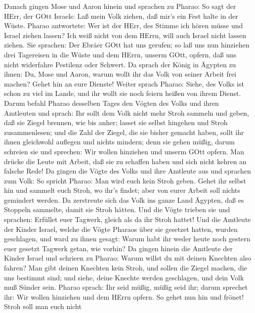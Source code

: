  Danach gingen Mose und Aaron hinein und sprachen zu Pharao:
So sagt der HErr, der GOtt Israels: Laß mein Volk ziehen, daß mir's ein
Fest halte in der Wüste.  Pharao antwortete: Wer ist der
HErr, des Stimme ich hören müsse und Israel ziehen lassen? Ich weiß
nicht von dem HErrn, will auch Israel nicht lassen ziehen. 
Sie sprachen: Der Ebräer GOtt hat uns gerufen; so laß uns nun hinziehen
drei Tagereisen in die Wüste und dem HErrn, unserm GOtt, opfern, daß uns
nicht widerfahre Pestilenz oder Schwert.  Da sprach der
König in Ägypten zu ihnen: Du, Mose und Aaron, warum wollt ihr das Volk
von seiner Arbeit frei machen? Gehet hin an eure Dienste! 
Weiter sprach Pharao: Siehe, des Volks ist schon zu viel im Lande, und
ihr wollt sie noch feiern heißen von ihrem Dienst.  Darum
befahl Pharao desselben Tages den Vögten des Volks und ihren Amtleuten
und sprach:  Ihr sollt dem Volk nicht mehr Stroh sammeln und
geben, daß sie Ziegel brennen, wie bis anher; lasset sie selbst hingehen
und Stroh zusammenlesen;  und die Zahl der Ziegel, die sie
bisher gemacht haben, sollt ihr ihnen gleichwohl auflegen und nichts
mindern; denn sie gehen müßig, darum schreien sie und sprechen: Wir
wollen hinziehen und unserm GOtt opfern.  Man drücke die
Leute mit Arbeit, daß sie zu schaffen haben und sich nicht kehren an
falsche Rede!  Da gingen die Vögte des Volks und ihre
Amtleute aus und sprachen zum Volk: So spricht Pharao: Man wird euch
kein Stroh geben.  Gehet ihr selbst hin und sammelt euch
Stroh, wo ihr's findet; aber von eurer Arbeit soll nichts gemindert
werden.  Da zerstreute sich das Volk ins ganze Land
Ägypten, daß es Stoppeln sammelte, damit sie Stroh hätten. 
Und die Vögte trieben sie und sprachen: Erfüllet euer Tagwerk, gleich
als da ihr Stroh hattet!  Und die Amtleute der Kinder
Israel, welche die Vögte Pharaos über sie gesetzet hatten, wurden
geschlagen, und ward zu ihnen gesagt: Warum habt ihr weder heute noch
gestern euer gesetzt Tagwerk getan, wie vorhin?  Da gingen
hinein die Amtleute der Kinder Israel und schrieen zu Pharao: Warum
willst du mit deinen Knechten also fahren?  Man gibt deinen
Knechten kein Stroh, und sollen die Ziegel machen, die uns bestimmt
sind; und siehe, deine Knechte werden geschlagen, und dein Volk muß
Sünder sein.  Pharao sprach: Ihr seid müßig, müßig seid
ihr; darum sprechet ihr: Wir wollen hinziehen und dem HErrn opfern.
 So gehet nun hin und frönet! Stroh soll man euch nicht
